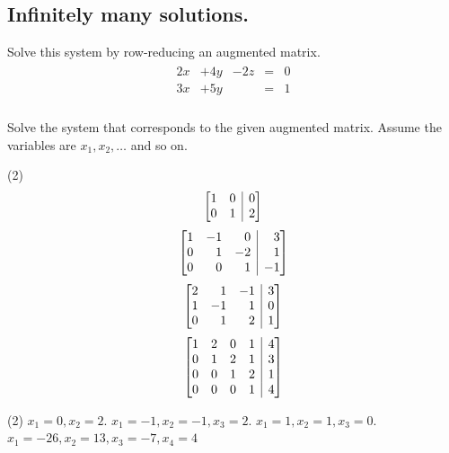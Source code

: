 \documentclass[12pt,fleqn]{book}
\makeatletter
\newenvironment{amatrix}[1]{%
	  \left[\begin{array}{@{}*{#1}{r}|r@{}}
	}{
	  \end{array}\right]
	}
\newcommand{\prb}[1]{\begin{Exercise}#1\end{Exercise}}
\newcommand{\sol}[1]{\begin{Answer}#1\end{Answer}}
\makeatother
\begin{document}
\subsection*{Infinitely many solutions.}
Solve this system by row-reducing an augmented matrix.
\begin{align*}
\begin{array}{rrrrr}
	  2x&+4y & -2z&=&0 \\
	  3x& +5y    &  &=&1 \\
\end{array}
\end{align*}
\clearpage
\prb{Solve the system that corresponds to the given augmented matrix.  Assume the variables are $x_1,x_2,\ldots$ and so on.
\begin{tasks}(2)
	\task \vspace{-2.3em}
		\begin{align*}
		\begin{amatrix}{2}
		1&0&0\\
		0&1&2
		\end{amatrix}
		\end{align*}
	\task \vspace{-2.3em}
		\begin{align*}
		\begin{amatrix}{3}
		1&-1&0&3\\
		0&1&-2&1\\
		0&0&1&-1
		\end{amatrix}
		\end{align*}
		\vspace{2in}
	\task \vspace{-2.3em}
		\begin{align*}
		\begin{amatrix}{3}
		2&1&-1&3\\
		1&-1&1&0\\
		0&1&2&1
		\end{amatrix}
		\end{align*}
	\task \vspace{-2.3em}
		\begin{align*}
		\begin{amatrix}{4}
		1&2&0&1&4\\
		0&1&2&1&3\\
		0&0&1&2&1\\
		0&0&0&1&4
		\end{amatrix}
		\end{align*}
\end{tasks}
}
\sol{
\begin{tasks}(2)
	\task $x_1=0,x_2=2$.
	\task $x_1=-1,x_2=-1,x_3=2$.
	\task $x_1=1,x_2=1,x_3=0$.
	\task $x_1=-26,x_2=13,x_3=-7,x_4=4$
\end{tasks}
}
\end{document}
